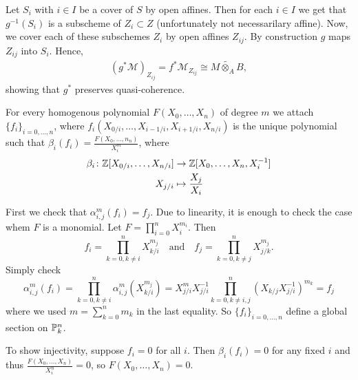 \begin{exercise}{1}
\begin{enumerate}
        Let $S_i$ with $i\in I$ be a cover of $S$ by open affines. Then for each $i\in I$ we get that
        $g^{-1}(S_i)$ is a subscheme of $Z_i\subset Z$ (unfortunately not necessarilary affine). Now, we cover
        each of these subschemes $Z_i$ by open affines $Z_{ij}$. By construction $g$ maps $Z_{ij}$ into $S_i$.
        Hence, 
        \begin{align*}
            (g^*\mathcal{M})_{Z_{ij}}=f^*\mathcal{M}_{Z_{ij}}\cong \widetilde{M\otimes_A B},
        \end{align*}
        showing that $g^*$ preserves quasi-coherence.
    \end{enumerate}
\end{exercise}

\begin{exercise}{2}
    For every homogenous polynomial $F(X_0, \dots, X_n)$ of degree $m$ we attach
    $\{f_i\}_{i=0,\dots,n}$, where $f_i(X_{0/i}, \dots, X_{i-1/i}, X_{i+1/i},
    X_{n/i})$ is the unique polynomial such that $\beta_i(f_i) = \frac{F(X_0,
    \dots, n_n)}{X^m_i}$, where
    \begin{align*}
        \beta_i \colon \mathbb{Z}[X_{0/i}, \dots, X_{n/i}] &\to \mathbb{Z}[X_0, \dots, X_n,
        X^{-1}_i] \\
        X_{j/i} &\mapsto \frac{X_j}{X_i}
    \end{align*}
    
    First we check that $\alpha^m_{i, j} (f_i) = f_j$. Due to linearity, it is
    enough to check the case whem $F$ is a monomial. Let $F = \prod^n_{i = 0}
    X^{m_i}_i$. Then
    \begin{equation*}
        f_i = \prod^n_{k = 0, k \not= i} X^{m_j}_{k/i} \quad\text{and}\quad f_j
        = \prod^n_{k = 0, k \not= j} X^{m_j}_{j/k}.
    \end{equation*}
    Simply check
    \begin{equation*}
        \alpha^m_{i, j} (f_i) =
        \prod^n_{k = 0, k \not= i} \alpha^m_{i, j} (X^{m_j}_{k/i}) =
        X^m_{j/i} X^{-1}_{j/i} \prod^n_{k = 0, k \not= i, j} (X_{k/j}
        X^{-1}_{j/i})^{m_k} = f_j
    \end{equation*}
    where we used $m = \sum^n_{k=0} m_k$ in the last equality.
    So $\{f_i\}_{i = 0, \dots, n}$ define a global section on $\mathbb{P}^n_k$.

    To show injectivity, suppose $f_i = 0$ for all $i$. Then $\beta_i(f_i) = 0$
    for any fixed $i$ and thus $\frac{F(X_0, \dots, X_n)}{X^n_i} = 0$, so
    $F(X_0, \dots, X_n) = 0$.


\end{exercise}
